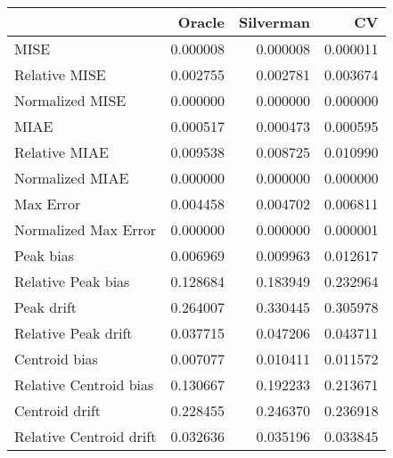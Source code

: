 \begin{tabular}{lrrr}
  \hline
 & Oracle & Silverman & CV \\ 
  \hline
MISE & 0.000008 & 0.000008 & 0.000011 \\ 
  Relative MISE & 0.002755 & 0.002781 & 0.003674 \\ 
  Normalized MISE & 0.000000 & 0.000000 & 0.000000 \\ 
  MIAE & 0.000517 & 0.000473 & 0.000595 \\ 
  Relative MIAE & 0.009538 & 0.008725 & 0.010990 \\ 
  Normalized MIAE & 0.000000 & 0.000000 & 0.000000 \\ 
  Max Error & 0.004458 & 0.004702 & 0.006811 \\ 
  Normalized Max Error & 0.000000 & 0.000000 & 0.000001 \\ 
  Peak bias & 0.006969 & 0.009963 & 0.012617 \\ 
  Relative Peak bias & 0.128684 & 0.183949 & 0.232964 \\ 
  Peak drift & 0.264007 & 0.330445 & 0.305978 \\ 
  Relative Peak drift & 0.037715 & 0.047206 & 0.043711 \\ 
  Centroid bias & 0.007077 & 0.010411 & 0.011572 \\ 
  Relative Centroid bias & 0.130667 & 0.192233 & 0.213671 \\ 
  Centroid drift & 0.228455 & 0.246370 & 0.236918 \\ 
  Relative Centroid drift & 0.032636 & 0.035196 & 0.033845 \\ 
   \hline
\end{tabular}
